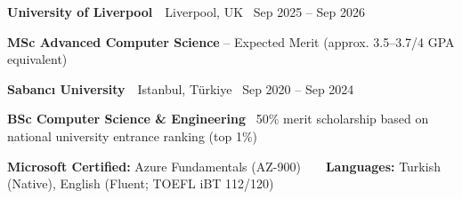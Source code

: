 {\color{navy}\bfseries University of Liverpool}{\color{mute}\ \textbar\ Liverpool, UK \textbar\ Sep 2025 – Sep 2026}\par
{\bfseries MSc Advanced Computer Science} – Expected Merit (approx. 3.5–3.7/4 GPA equivalent)\par
\vspace{2pt}
{\color{navy}\bfseries Sabancı University}{\color{mute}\ \textbar\ Istanbul, Türkiye \textbar\ Sep 2020 – Sep 2024}\par
{\bfseries BSc Computer Science \& Engineering} \textbar\ 50\% merit scholarship based on national university entrance ranking (top 1\%)\par

{\color{navy}\bfseries Microsoft Certified:} Azure Fundamentals (AZ-900)\ \ \textbf{\textbar}\ \ {\color{navy}\bfseries Languages:} Turkish (Native), English (Fluent; TOEFL iBT 112/120)\par
